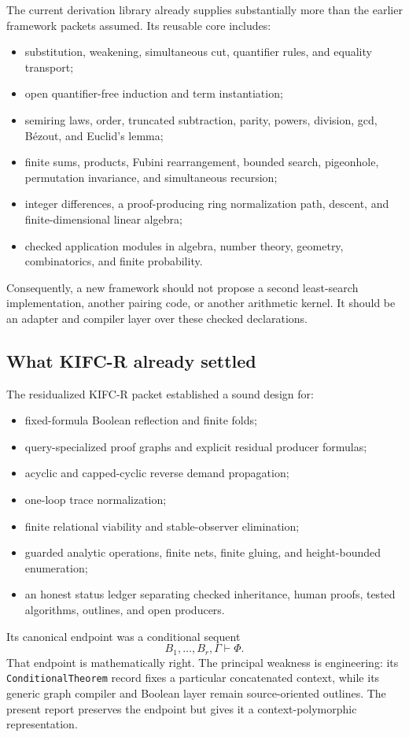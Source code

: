 The current derivation library already supplies substantially more than the earlier framework packets assumed.  Its reusable core includes:
\begin{itemize}
  \item substitution, weakening, simultaneous cut, quantifier rules, and equality transport;
  \item open quantifier-free induction and term instantiation;
  \item semiring laws, order, truncated subtraction, parity, powers, division, gcd, B\'ezout, and Euclid's lemma;
  \item finite sums, products, Fubini rearrangement, bounded search, pigeonhole, permutation invariance, and simultaneous recursion;
  \item integer differences, a proof-producing ring normalization path, descent, and finite-dimensional linear algebra;
  \item checked application modules in algebra, number theory, geometry, combinatorics, and finite probability.
\end{itemize}
Consequently, a new framework should not propose a second least-search implementation, another pairing code, or another arithmetic kernel.  It should be an adapter and compiler layer over these checked declarations.

\subsection{What KIFC-R already settled}

The residualized KIFC-R packet established a sound design for:
\begin{itemize}
  \item fixed-formula Boolean reflection and finite folds;
  \item query-specialized proof graphs and explicit residual producer formulas;
  \item acyclic and capped-cyclic reverse demand propagation;
  \item one-loop trace normalization;
  \item finite relational viability and stable-observer elimination;
  \item guarded analytic operations, finite nets, finite gluing, and height-bounded enumeration;
  \item an honest status ledger separating checked inheritance, human proofs, tested algorithms, outlines, and open producers.
\end{itemize}
Its canonical endpoint was a conditional sequent
\[
                    B_1,\ldots,B_r,\Gamma\vdash\Phi.
\]
That endpoint is mathematically right.  The principal weakness is engineering: its \texttt{ConditionalTheorem} record fixes a particular concatenated context, while its generic graph compiler and Boolean layer remain source-oriented outlines.  The present report preserves the endpoint but gives it a context-polymorphic representation.

